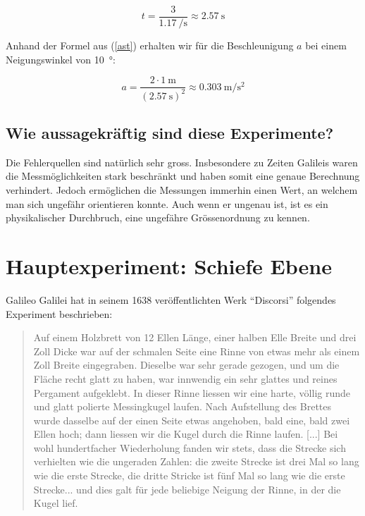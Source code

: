 \documentclass[a4paper, titlepage]{article}
\newcommand{\accunit}[1]{\SI{#1}{\metre\per\square\second}}
\begin{document}
    \begin{equation}
        t = \frac{3}{\SI{1.17}{\per\second}} \approx \SI{2.57}{\second}
    \end{equation}

    Anhand der Formel aus (\ref{ast}) erhalten wir für die Beschleunigung $a$
    bei einem Neigungswinkel von \SI{10}{\degree}:

    \begin{equation}
        a = \frac{2 \cdot \SI{1}{\metre}}{(\SI{2.57}{\second})^2} \approx \accunit{0.303}
    \end{equation}
    
    \subsection{Wie aussagekräftig sind diese Experimente?}
    Die Fehlerquellen sind natürlich sehr gross. Insbesondere zu Zeiten 
    Galileis waren die Messmöglichkeiten stark beschränkt und haben somit
    eine genaue Berechnung verhindert. Jedoch ermöglichen die Messungen
    immerhin einen Wert, an welchem man sich ungefähr orientieren konnte.
    Auch wenn er ungenau ist, ist es ein physikalischer Durchbruch, eine
    ungefähre Grössenordnung zu kennen.


    \section{Hauptexperiment: Schiefe Ebene}

    Galileo Galilei hat in seinem 1638 veröffentlichten Werk ``Discorsi''
    folgendes Experiment beschrieben:
    \begin{quote}
    Auf einem Holzbrett von 12 Ellen Länge, einer halben Elle Breite
    und drei Zoll Dicke war auf der schmalen Seite eine Rinne von
    etwas mehr als einem Zoll Breite eingegraben. Dieselbe war sehr
    gerade gezogen, und um die Fläche recht glatt zu haben, war
    innwendig ein sehr glattes und reines Pergament aufgeklebt.
    In dieser Rinne liessen wir eine harte, völlig runde und glatt
    polierte Messingkugel laufen. Nach Aufstellung des Brettes
    wurde dasselbe auf der einen Seite etwas angehoben,
    bald eine, bald zwei Ellen hoch; dann liessen wir die Kugel durch die
    Rinne laufen. [...] 
    Bei wohl hundertfacher Wiederholung fanden wir stets, 
    dass die Strecke sich verhielten wie die ungeraden Zahlen: 
    die zweite Strecke ist drei Mal so lang wie die erste Strecke, 
    die dritte Stricke ist fünf Mal so lang wie die erste Strecke... 
    und dies galt für jede beliebige Neigung der Rinne, in der die Kugel 
    lief. \cite{physicsbook2}
    \end{quote}
\end{document}
